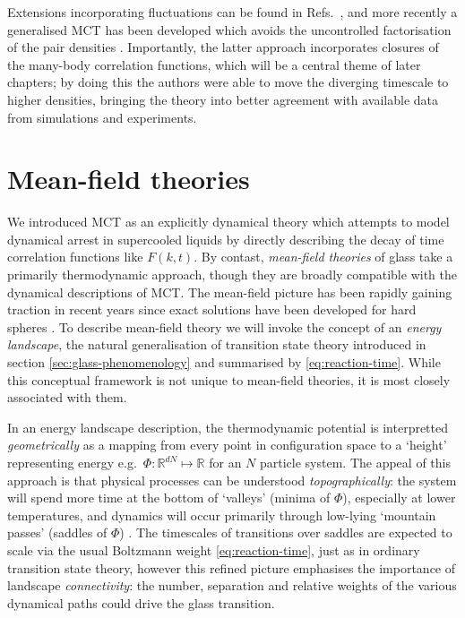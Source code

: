 \documentclass[11pt,twoside]{report}
\begin{document}
Extensions incorporating fluctuations can be found in Refs.\ \cite{BiroliPRL2006,SzamelPTEP2013}, and more recently a generalised MCT has been developed which avoids the uncontrolled factorisation of the pair densities \cite{JanssenPRL2015,JanssenFP2018}.
Importantly, the latter approach incorporates closures of the many-body correlation functions, which will be a central theme of later chapters; by doing this the authors were able to move the diverging timescale to higher densities, bringing the theory into better agreement with available data from simulations and experiments.

\section{Mean-field theories}
\label{sec:mean-field-glass}

We introduced MCT as an explicitly dynamical theory which attempts to model dynamical arrest in supercooled liquids by directly describing the decay of time correlation functions like $F(k, t)$.
By contast, \emph{mean-field theories} of glass take a primarily thermodynamic approach, though they are broadly compatible with the dynamical descriptions of MCT.
The mean-field picture has been rapidly gaining traction in recent years since exact solutions have been developed for hard spheres \cite{ParisiRMP2010,KurchanJSM2012,KurchanJPCB2013,CharbonneauNC2014,CharbonneauJSM2014}.
To describe mean-field theory we will invoke the concept of an \emph{energy landscape}, the natural generalisation of transition state theory introduced in section \ref{sec:glass-phenomenology} and summarised by \eqref{eq:reaction-time}.
While this conceptual framework is not unique to mean-field theories, it is most closely associated with them.

In an energy landscape description, the thermodynamic potential is interpretted \emph{geometrically} as a mapping from every point in configuration space to a `height' representing energy e.g.\ $\Phi: \mathbb{R}^{dN} \mapsto \mathbb{R}$ for an $N$ particle system.
The appeal of this approach is that physical processes can be understood \emph{topographically}: the system will spend more time at the bottom of `valleys' (minima of $\Phi$), especially at lower temperatures, and dynamics will occur primarily through low-lying `mountain passes' (saddles of $\Phi$) \cite{StillingerS1995}.
The timescales of transitions over saddles are expected to scale via the usual Boltzmann weight \eqref{eq:reaction-time}, just as in ordinary transition state theory, however this refined picture emphasises the importance of landscape \emph{connectivity}: the number, separation and relative weights of the various dynamical paths could drive the glass transition.
\end{document}
